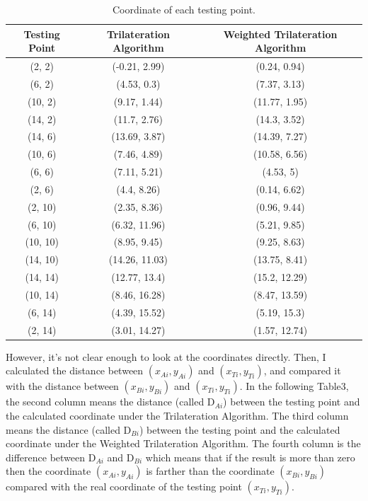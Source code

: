 \documentclass{sigchi}
\newcommand\tabhead[1]{\small\textbf{#1}}
\newcommand\tabhead[1]{\small\textbf{#1}}
\begin{document}
\begin{table}[!h]
  \centering
  \begin{tabular}{|c|c|c|}
    \hline
    \tabhead{Testing Point} &
    \multicolumn{1}{|p{0.3\columnwidth}|}{\centering\tabhead{Trilateration Algorithm }} &
    \multicolumn{1}{|p{0.4\columnwidth}|}{\centering\tabhead{Weighted Trilateration Algorithm }} \\
    \hline
    (2, 2) & (-0.21, 2.99)&(0.24, 0.94) \\
    \hline
    (6, 2) & (4.53, 0.3)&(7.37, 3.13) \\
    \hline
    (10, 2) & (9.17, 1.44) & (11.77, 1.95)\\
    \hline
    (14, 2) & (11.7, 2.76) & (14.3, 3.52) \\
    \hline
    (14, 6) &(13.69, 3.87) & (14.39, 7.27)  \\
    \hline
    (10, 6) & (7.46, 4.89) & (10.58, 6.56)  \\
    \hline
    (6, 6) & (7.11, 5.21) & (4.53, 5) \\
    \hline
    (2, 6) &(4.4, 8.26) & (0.14, 6.62) \\
    \hline
    (2, 10) &(2.35, 8.36)&(0.96, 9.44)  \\
    \hline
    (6, 10) & (6.32, 11.96) & (5.21, 9.85) \\
    \hline
    (10, 10) &(8.95, 9.45) & (9.25, 8.63)  \\
    \hline
    (14, 10) &(14.26, 11.03) & (13.75, 8.41)  \\
    \hline
    (14, 14) & (12.77, 13.4) & (15.2, 12.29)  \\
    \hline
    (10, 14) &(8.46, 16.28)&(8.47, 13.59)  \\
    \hline
    (6, 14) & (4.39, 15.52)& (5.19, 15.3) \\
    \hline
    (2, 14) & (3.01, 14.27)&(1.57, 12.74) \\
    \hline
  \end{tabular}
  \caption{Coordinate of each testing point.}
  \label{tab:table1}
\end{table}

However, it’s not clear enough to look at the coordinates directly. Then, I calculated the distance between $(x_{Ai}, y_{Ai})$ and $(x_{Ti}, y_{Ti})$, and compared it with the distance between $(x_{Bi}, y_{Bi})$ and $(x_{Ti}, y_{Ti})$. In the following Table3, the second column means the distance (called D$_{Ai}$) between the testing point and the calculated coordinate under the Trilateration Algorithm. The third column means the distance (called D$_{Bi}$) between the testing point and the calculated coordinate under the Weighted Trilateration Algorithm. The fourth column is the difference between D$_{Ai}$ and D$_{Bi}$ which means that if the result is more than zero then the coordinate $(x_{Ai}, y_{Ai})$ is farther than the coordinate $(x_{Bi}, y_{Bi})$ compared with the real coordinate of the testing point $(x_{Ti}, y_{Ti})$.
\end{document}
